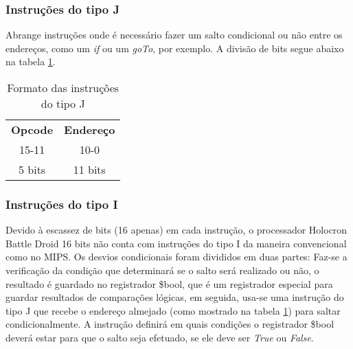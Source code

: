 \documentclass{article}
\newcommand\tab[1][0.50cm]{\hspace*{#1}}
\begin{document}
			\subsubsection{Instru\c{c}\~{o}es do tipo J}
				\tab Abrange instru\c{c}\~{o}es onde \'{e} necess\'{a}rio fazer um salto condicional ou n\~{a}o entre os endere\c{c}os, como um \textit{if} ou um \textit{goTo}, por exemplo. A divis\~{a}o de bits segue abaixo na tabela \ref{tab:J_type_instructions_format}.
				\begin{table}[H]
					\centering
					\caption[Instru\c{c}\~{o}es do tipo J]{Formato das instru\c{c}\~{o}es do tipo J}
					\label{tab:J_type_instructions_format}
					\begin{tabular}{c c}
						\textbf{Opcode} & \textbf{Endere\c{c}o} \\ 	
						15-11 & 10-0 \\
						5 bits & 11 bits\\
					\end{tabular}
				\end{table}
			\subsubsection{Instru\c{c}\~{o}es do tipo I}
				\tab Devido \`{a} escassez de bits (16 apenas) em cada instru\c{c}\~{a}o, o processador Holocron Battle Droid 16 bits n\~{a}o conta com instru\c{c}\~{o}es do tipo I da maneira convencional como no MIPS. Os desvios condicionais foram divididos em duas partes: Faz-se a verifica\c{c}\~{a}o da condi\c{c}\~{a}o que determinar\'{a} se o salto ser\'{a} realizado ou n\~{a}o, o resultado \'{e} guardado no registrador \$bool, que \'{e} um registrador especial para guardar resultados de compara\c{c}\~{o}es l\'{o}gicas, em seguida, usa-se uma instru\c{c}\~{a}o do tipo J que recebe o endere\c{c}o almejado (como mostrado na tabela \ref{tab:J_type_instructions_format}) para saltar condicionalmente. A instru\c{c}\~{a}o definir\'{a} em quais condi\c{c}\~{o}es o registrador \$bool dever\'{a} estar para que o salto seja efetuado, se ele deve ser \textit{True} ou \textit{False}.
\end{document}
